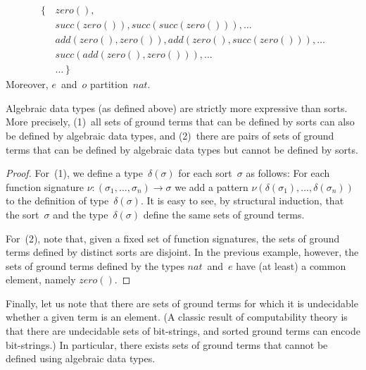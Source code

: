 \documentclass[a4paper,12pt,oneside,fleqn]{book} %
\newcommand{\rg}[1]{\marginpar{\tiny\raggedright\textcolor{blue}{\bf rg:} #1}}
\renewcommand{\rg}{}
\begin{document}
\begin{equation}
\begin{aligned}
\{\,&\mathit{zero}(), \\
    &\mathit{succ}(\mathit{zero}()),
        \mathit{succ}(\mathit{succ}(\mathit{zero}())), \ldots \\
    &\mathit{add}(\mathit{zero}(), \mathit{zero}()),
        \mathit{add}(\mathit{zero}(), \mathit{succ}(\mathit{zero}())),
        \ldots \\
    &\mathit{succ}(\mathit{add}(\mathit{zero}(), \mathit{zero}())),
        \ldots \\
    &\ldots\, \}
\end{aligned}
\end{equation}
Moreover, $e$~and~$o$ partition~$\mathit{nat}$.

\begin{proposition}
Algebraic data types (as defined above) are strictly more expressive than
sorts. More precisely, (1)~all sets of ground terms that can be defined by
sorts can also be defined by algebraic data types, and (2)~there are pairs
of sets of ground terms that can be defined by algebraic data types but
cannot be defined by sorts.
\end{proposition}

\begin{proof}
For~(1), we define a type~$\delta(\sigma)$ for each sort~$\sigma$ as
follows: For each function signature
$\nu:(\sigma_1,\ldots,\sigma_n)\to\sigma$ we add a pattern
$\nu(\delta(\sigma_1),\ldots,\delta(\sigma_n))$ to the definition of
type~$\delta(\sigma)$. It is easy to see, by structural induction, that the
sort~$\sigma$ and the type~$\delta(\sigma)$ define the same sets of ground
terms.

For~(2), note that, given a fixed set of function signatures, the sets of
ground terms defined by distinct sorts are disjoint. In the previous
example, however, the sets of ground terms defined by the types
$\mathit{nat}$~and~$e$ have (at least) a common element, namely
$\mathit{zero}()$.
\end{proof}

Finally, let us note that there are sets of ground terms for which it is
undecidable whether a given term is an element.  (A classic result of
computability theory is that there are undecidable sets of bit-strings, and
sorted ground terms can encode bit-strings.) In particular, there exists
sets of ground terms that cannot be defined using algebraic data types.
\end{document}
